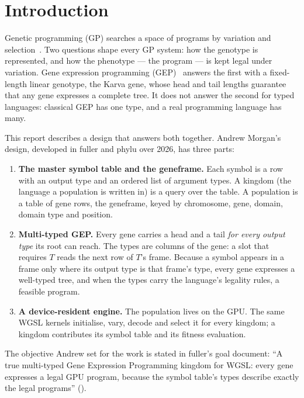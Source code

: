 \documentclass[11pt,a4paper]{report}
\newcommand{\src}[1]{{\footnotesize\path{#1}}}
\begin{document}
\tableofcontents

\chapter{Introduction}
\label{ch:intro}

Genetic programming (GP) searches a space of programs by variation and
selection~\cite{koza1992gp}. Two questions shape every GP system: how the
genotype is represented, and how the phenotype --- the program --- is kept
legal under variation. Gene expression programming
(GEP)~\cite{ferreira2001gep,ferreira2006book} answers the first with a fixed-length
linear genotype, the Karva gene, whose head and tail lengths guarantee that any
gene expresses a complete tree. It does not answer the second for typed
languages: classical GEP has one type, and a real programming language has
many.

This report describes a design that answers both together. Andrew Morgan's
design, developed in fuller and phylu over 2026, has three parts:
\begin{enumerate}
\item \textbf{The master symbol table and the geneframe.} Each symbol is a row
with an output type and an ordered list of argument types. A kingdom (the
language a population is written in) is a query over the table. A population
is a table of gene rows, the geneframe, keyed by chromosome, gene, domain,
domain type and position.
\item \textbf{Multi-typed GEP.} Every gene carries a head and a tail
\emph{for every output type} its root can reach. The types are columns of the
gene: a slot that requires $T$ reads the next row of $T$'s frame. Because a
symbol appears in a frame only where its output type is that frame's type, every
gene expresses a well-typed tree, and when the types carry the language's
legality rules, a feasible program.
\item \textbf{A device-resident engine.} The population lives on the GPU. The
same WGSL kernels initialise, vary, decode and select it for every kingdom; a
kingdom contributes its symbol table and its fitness evaluation.
\end{enumerate}
The objective Andrew set for the work is stated in fuller's goal document:
``A true multi-typed Gene Expression Programming kingdom for WGSL: every gene
expresses a legal GPU program, because the symbol table's types describe
exactly the legal programs'' (\src{fuller/docs/GOAL.md:3}).
\end{document}
